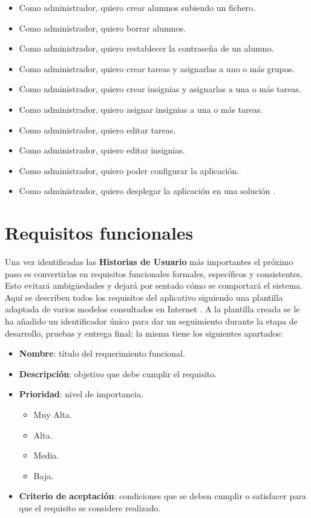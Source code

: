 \documentclass[11pt,spanish,listoffigures,listoftables]{tfgetsinf}
\begin{document}
\begin{itemize}
	\item Como \gls{administrador}, quiero crear \gls{alumno}s subiendo un fichero.
	\item Como \gls{administrador}, quiero borrar \gls{alumno}s.
	\item Como \gls{administrador}, quiero restablecer la contraseña de un \gls{alumno}.
	\item Como \gls{administrador}, quiero crear \gls{tarea}s y asignarlas a uno o más \gls{grupo}s.
	\item Como \gls{administrador}, quiero crear \gls{insignia}s y asignarlas a una o más \gls{tarea}s.
	\item Como \gls{administrador}, quiero asignar \gls{insignia}s a una o más \gls{tarea}s.
	\item Como \gls{administrador}, quiero editar \gls{tarea}s.
	\item Como \gls{administrador}, quiero editar \gls{insignia}s.
	\item Como \gls{administrador}, quiero poder configurar la aplicación.
	\item Como \gls{administrador}, quiero desplegar la aplicación en una solución .
\end{itemize}

\section{Requisitos funcionales}

Una vez identificadas las \textbf{Historias de Usuario} más importantes el próximo paso es convertirlas en requisitos funcionales formales, específicos y consistentes. Esto evitará ambigüedades y dejará por sentado cómo se comportará el sistema. Aquí se describen todos los requisitos del aplicativo siguiendo una plantilla adaptada de varios modelos consultados en Internet \cite{link-esp-rq-jan}. A la plantilla creada se le ha añadido un identificador único para dar un seguimiento durante la etapa de desarrollo, pruebas y entrega final; la misma tiene los siguientes apartados:

\begin{itemize}
	\item \textbf{Nombre}: título del requerimiento funcional.
	\item \textbf{Descripción}: objetivo que debe cumplir el requisito.
	\item \textbf{Prioridad}: nivel de importancia. 
	\begin{itemize}
		\item Muy Alta.
		\item Alta.
		\item Media.
		\item Baja.
	\end{itemize}
	
	\item \textbf{Criterio de aceptación}: condiciones que se deben cumplir o satisfacer para que el requisito se considere realizado.
\end{itemize}
\end{document}
